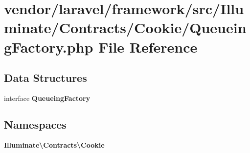 \section{vendor/laravel/framework/src/\+Illuminate/\+Contracts/\+Cookie/\+Queueing\+Factory.php File Reference}
\label{_queueing_factory_8php}
\subsection*{Data Structures}
\begin{DoxyCompactItemize}
\item 
interface {\bf Queueing\+Factory}
\end{DoxyCompactItemize}
\subsection*{Namespaces}
\begin{DoxyCompactItemize}
\item 
 {\bf Illuminate\textbackslash{}\+Contracts\textbackslash{}\+Cookie}
\end{DoxyCompactItemize}
